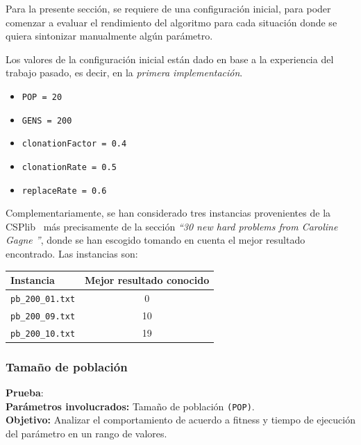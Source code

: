 
Para la presente sección, se requiere de una configuración inicial,
para poder comenzar a evaluar el rendimiento del algoritmo para
cada situación donde se quiera sintonizar manualmente algún parámetro.

Los valores de la configuración inicial están dado en base a la experiencia
del trabajo pasado, es decir, en la \emph{primera implementación}.

\begin{itemize}
	\item \texttt{POP = 20}
	\item \texttt{GENS = 200}
	\item \texttt{clonationFactor = 0.4}
	\item \texttt{clonationRate = 0.5}
	\item \texttt{replaceRate = 0.6}
\end{itemize}

Complementariamente, se han considerado tres instancias provenientes de la CSPlib~\cite{CSP}
más precisamente de la sección \emph{``30 new hard problems from Caroline Gagne ''},
donde se han escogido tomando en cuenta el mejor resultado encontrado.
Las instancias son:

\begin{center}
	\begin{tabular}{|l|c|}
	\hline
	\textbf{Instancia} & \textbf{Mejor resultado conocido} \\\hline
	\texttt{pb\_200\_01.txt} & 0 \\\hline
	\texttt{pb\_200\_09.txt} & 10 \\\hline
	\texttt{pb\_200\_10.txt} & 19 \\\hline
	\end{tabular}
\end{center}
\newpage
\subsubsection{Tamaño de población}

\textbf{Prueba}: \\

\textbf{Parámetros involucrados:} Tamaño de población \texttt{(POP)}.\\

\textbf{Objetivo:} Analizar el comportamiento de acuerdo a fitness y tiempo de ejecución del parámetro en un rango de valores.\\

